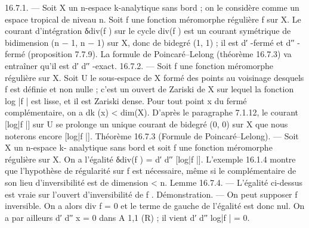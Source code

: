 \documentclass[
  10pt,
]{article}
\newenvironment{Shaded}{}{}
\newcommand{\NormalTok}[1]{#1}
\begin{document}
\begin{Shaded}
\begin{Highlighting}[]
\NormalTok{16.7.1. — Soit X un n{-}espace k{-}analytique sans bord ; on le considère comme un espace}
\NormalTok{tropical de niveau n.}
\NormalTok{   Soit f une fonction méromorphe régulière f sur X. Le courant d’intégration δdiv(f ) sur}
\NormalTok{le cycle div(f ) est un courant symétrique de bidimension (n − 1, n − 1) sur X, donc de}
\NormalTok{bidegré (1, 1) ; il est d′ {-}fermé et d′′ {-}fermé (proposition 7.7.9).}
\NormalTok{   La formule de Poincaré–Lelong (théorème 16.7.3) va entraîner qu’il est d′ d′′ {-}exact.}
\NormalTok{16.7.2. — Soit f une fonction méromorphe régulière sur X. Soit U le sous{-}espace}
\NormalTok{de X formé des points au voisinage desquels f est définie et non nulle ; c’est un ouvert}
\NormalTok{de Zariski de X sur lequel la fonction log |f | est lisse, et il est Zariski dense. Pour tout}
\NormalTok{point x du fermé complémentaire, on a dk (x) \textless{} dim(X). D’après le paragraphe 7.1.12,}
\NormalTok{le courant [log|f |] sur U se prolonge un unique courant de bidegré (0, 0) sur X que nous}
\NormalTok{noterons encore [log|f |].}
\NormalTok{Théorème 16.7.3 (Formule de Poincaré–Lelong). — Soit X un n{-}espace k{-}}
\NormalTok{analytique sans bord et soit f une fonction méromorphe régulière sur X. On a l’égalité}
\NormalTok{                                   δdiv(f ) = d′ d′′ [log|f |].}
\NormalTok{   L’exemple 16.1.4 montre que l’hypothèse de régularité sur f est nécessaire, même si}
\NormalTok{le complémentaire de son lieu d’inversibilité est de dimension \textless{} n.}
\NormalTok{Lemme 16.7.4. — L’égalité ci{-}dessus est vraie sur l’ouvert d’inversibilité de f .}
\NormalTok{Démonstration. — On peut supposer f inversible. On a alors div f = 0 et le terme}
\NormalTok{de gauche de l’égalité est donc nul. On a par ailleurs d′ d′′ x = 0 dans A 1,1 (R) ; il}
\NormalTok{vient d′ d′′ log|f | = 0.}


\end{Highlighting}
\end{Shaded}
\end{document}
